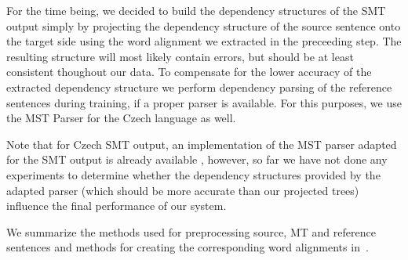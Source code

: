 For the time being, we decided to build the dependency structures of the SMT output simply
by projecting the dependency structure of the source sentence onto the target side
using the word alignment we extracted in the preceeding step. The resulting structure
will most likely contain errors, but should be at least consistent thoughout our data.
To compensate for the lower accuracy of the extracted dependency structure we perform
dependency parsing of the reference sentences during training, if a proper parser
is available. For this purposes, we use the MST Parser for the Czech language as well.

Note that for Czech SMT output, an implementation of the MST parser adapted for the SMT output
is already available \citep{biblio:RoDuUsingParallel2012}, however, so far we have not done any experiments
to determine whether the dependency structures provided by the adapted parser (which
should be more accurate than our projected trees) influence the final performance of our system.

We summarize the methods used for preprocessing source, MT and reference sentences and methods
for creating the corresponding word alignments in~.


